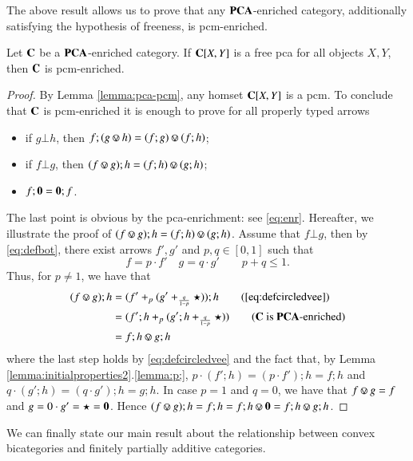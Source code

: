The above result allows us to prove that any $\mathbf{PCA}$-enriched category, additionally satisfying the hypothesis of freeness, is pcm-enriched.

\begin{proposition}\label{prop:pca-pcm enrichment}
Let $\mathbf{C}$ be a $\mathbf{PCA}$-enriched category. If $\mathbf{C}[X,Y]$ is a free pca for all objects $X,Y$, then $\mathbf{C}$ is pcm-enriched.
\end{proposition}
\begin{proof}
By Lemma \ref{lemma:pca-pcm}, any homset $\mathbf{C}[X,Y]$ is a pcm. To conclude that  $\mathbf{C}$ is pcm-enriched it is enough to prove  for all properly typed arrows
\begin{itemize}
\item if $g\bot h$, then $f;(g \circledvee h) = (f;g) \circledvee (f;h) $;
\item if $f\bot g$, then  $(f \circledvee g); h = (f;h) \circledvee (g;h)$;
\item $f;\mathbf{0}=\mathbf{0};f$.
\end{itemize}
The last point is obvious by the pca-enrichment: see \eqref{eq:enr}. Hereafter, we illustrate the proof of $(f \circledvee g); h = (f;h) \circledvee (g;h)$.
%
Assume that $f\bot g$, then by \eqref{eq:defbot}, there exist arrows $f',g'$ and  $p,q\in [0,1]$ such that
\[f=p\cdot f' \quad g=q\cdot g' \qquad p+q\leq 1\text{.}\]
Thus, for $p\neq 1$, we have that
\begin{align*}
(f\circledvee g); h & = (f' +_{p} (g'+_{\frac{q}{1-p}} \star));h \tag{\eqref{eq:defcircledvee}} \\
&  = (f';h +_{p} (g';h +_{\frac{q}{1-p}} \star)) \tag{$\Cat{C}$ is $\Cat{PCA}$-enriched} \\
&= f;h \circledvee g;h
\end{align*}
where the last step holds by \eqref{eq:defcircledvee} and the fact that,  by Lemma \ref{lemma:initialproperties2}.\ref{lemma:p;}, $p\cdot (f';h) = (p\cdot f'); h = f;h$ and $q\cdot (g';h) = (q\cdot g'); h = g;h$. In case $p=1$ and $q=0$, we have that $f\circledvee g = f$ and $g=0\cdot g' = \star=\mathbf{0}$. Hence $(f\circledvee g); h = f;h =f;h \circledvee \zeropcm = f;h \circledvee g;h$.
\end{proof}


We can finally state our main result about the relationship between convex bicategories and finitely partially additive categories.

